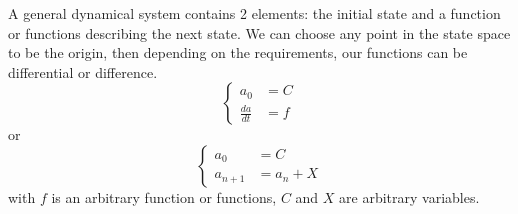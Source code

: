 \documentclass[a4paper]{article}
\begin{document}
A general dynamical system contains 2 elements: the initial state and a function or functions describing the next state.
We can choose any point in the state space to be the origin, then depending on the requirements, our functions can be differential or difference.
\begin{equation*}
  \begin{cases}
    a_0           & = C \\
    \frac{da}{dt} & = f
  \end{cases}
\end{equation*}
or
\begin{equation*}
  \begin{cases}
    a_0       & = C       \\
    a_{n + 1} & = a_n + X
  \end{cases}
\end{equation*}
with \(f\) is an arbitrary function or functions, \(C\) and \(X\) are arbitrary variables.
\end{document}

